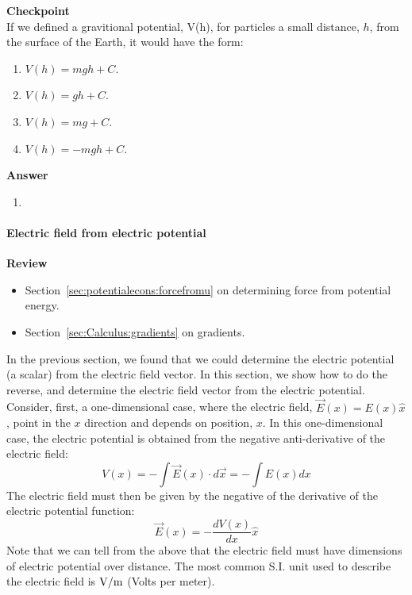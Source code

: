 \begin{framed}
\textbf{Checkpoint}\\
If we defined a gravitional potential, V(h), for particles a small distance, $h$, from the surface of the Earth, it would have the form:

\begin{enumerate}
\item $V(h) = mgh + C$.
\item $V(h) = gh + C$.
\item $V(h) = mg + C$.
\item $V(h) = -mgh + C$.
\end{enumerate}

\begin{framed}
\textbf{Answer}\\
\begin{enumerate}[resume]
\item
\end{enumerate}
\end{framed}
\end{framed}

\paragraph{Electric field from electric potential}\label{sec:potential:fieldfrompotential}

\begin{framed}
\textbf{Review}\\
\begin{itemize}
\item Section~\ref{sec:potentialecons:forcefromu} on determining force from potential energy.
\item Section~\ref{sec:Calculus:gradients} on gradients.
\end{itemize}
\end{framed}

In the previous section, we found that we could determine the electric potential (a scalar) from the electric field vector. In this section, we show how to do the reverse, and determine the electric field vector from the electric potential. Consider, first, a one-dimensional case, where the electric field, $\vec E(x)= E(x) \hat x$, point in the $x$ direction and depends on position, $x$. In this one-dimensional case, the electric potential is obtained from the negative anti-derivative of the electric field:
\begin{equation}
V(x)=-\int \vec E(x)\cdot d\vec x=-\int E(x) dx
\end{equation}
The electric field must then be given by the negative of the derivative of the electric potential function:
\begin{equation}
\vec E(x) = -\frac{dV(x)}{dx}\hat x
\end{equation}
Note that we can tell from the above that the electric field must have dimensions of electric potential over distance. The most common S.I. unit used to describe the electric field is ${\rm V/m}$ (Volts per meter).

